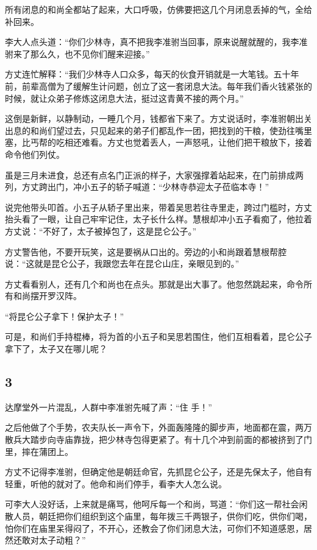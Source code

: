 所有闭息的和尚全都站了起来，大口呼吸，仿佛要把这几个月闭息丢掉的气，全给补回来。

李大人点头道：“你们少林寺，真不把我李准驸当回事，原来说醒就醒的，我李准驸来了那么久，也不见你们醒来迎接。”

方丈连忙解释：“我们少林寺人口众多，每天的伙食开销就是一大笔钱。五十年前，前辈高僧为了缓解生计问题，创立了这一套闭息大法。每年我们香火钱紧张的时候，就让众弟子修炼这闭息大法，挺过这青黄不接的两个月。”

这倒是新鲜，以静制动，一睡几个月，钱都省下来了。方丈说话时，李准驸朝出关出息的和尚们望过去，只见起来的弟子们都乱作一团，把找到的干粮，使劲往嘴里塞，比丐帮的吃相还难看。方丈也觉着丢人，一声怒吼，让他们把干粮放下，接着命令他们列仗。

虽是三月未进食，总还有点名门正派的样子，大家强撑着站起来，在门前排成两列，方丈跨出门，冲小五子的轿子喊道：“少林寺恭迎太子莅临本寺！”

说完他带头叩首。小五子从轿子里出来，带着吴思若往寺里走，跨过门槛时，方丈抬头看了一眼，让自己牢牢记住，太子长什么样。慧根却冲小五子看痴了，他拉着方丈说：“不好了，太子被掉包了，这是昆仑公子。”

方丈警告他，不要开玩笑，这是要祸从口出的。旁边的小和尚跟着慧根帮腔说：“这就是昆仑公子，我跟您去年在昆仑山庄，亲眼见到的。”

方丈看看别人，还有几个和尚也在点头。那就是出大事了。他忽然跳起来，命令所有和尚摆开罗汉阵。

“将昆仑公子拿下！保护太子！”

可是，和尚们手持棍棒，将为首的小五子和吴思若围住，他们互相看着，昆仑公子拿下了，太子又在哪儿呢？
\newline

{\centering\subsection{3}}

达摩堂外一片混乱，人群中李准驸先喊了声：“住
手！”

之后他做了个手势，农夫队长一声令下，外面轰隆隆的脚步声，地面都在震，两万散兵大踏步向寺庙靠拢，把少林寺包得更紧了。有十几个冲到前面的都被挤到了门里，摔在蒲团上。

方丈不记得李准驸，但确定他是朝廷命官，先抓昆仑公子，还是先保太子，他自有轻重，听他的就对了。他命和尚们停手，看李大人怎么说。

可李大人没好话，上来就是痛骂，他呵斥每一个和尚，骂道：“你们这一帮社会闲散人员，朝廷把你们组织到这个庙里，每年拨三千两银子，供你们吃，供你们喝，怕你们在庙里呆得闷了，不开心，还教会了你们闭息大法，可你们不知道感恩，居然还敢对太子动粗？”

